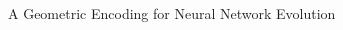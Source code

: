 \begin{frame}{\tciii{} A Geometric Encoding for Neural Network Evolution}
    
    \begin{columns}
    \begin{column}{0.45\linewidth}
    \begin{center}
    \end{center}
    \end{column}
    
    \begin{column}{0.45\linewidth}
    \begin{center}
    \end{center}
    \end{column}
    \end{columns}
    

\end{frame}

